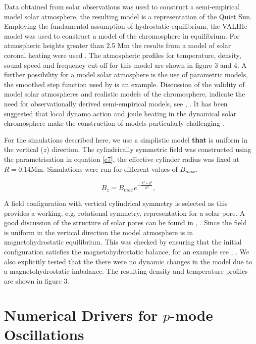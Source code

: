 \documentclass[physics,article,submit,pdftex,moreauthors]{Definitions/mdpi}
\begin{document}
Data obtained from solar observations was used to construct a semi-empirical model solar atmosphere, the resulting model is a representation of the Quiet Sun. Employing the fundamental assumption of hydrostatic equilibrium, the VALIIIc model \citet{Vernazza1981} was used to construct a model of the chromosphere in equilibrium. For atmospheric heights greater than 2.5 Mm the results from a model of solar coronal heating were used \citet{McWhirter1975}. The atmospheric profiles for temperature, density, sound speed and frequency cut-off for this model are shown in figure 3 and 4.
A further possibility for a model solar atmosphere is the use of parametric models, the smoothed step function used by \citet{Murawski2010} is an example. Discussion of the validity of model solar atmospheres and realistic models of the chromosphere,  indicate the need for observationally derived semi-empirical models, see \citet{Carlsson1995}, \citet{Kalkofen2012}. It has been suggested that local dynamo action and joule heating in the dynamical solar chromosphere make the construction of models particularly challenging \citet{Leenaarts2011}.


For the simulations described here, we use a simplistic model {\bf that} is uniform in the vertical ($z$) direction. The cylindrically symmetric field was constructed using  the parametrisation in equation \ref{e7}, the effective cylinder radius was fixed at $R=0.14$Mm. Simulations were run for different values of $B_{max}$.

\begin{equation}
B_{z}=B_{max} e^{-\frac{x^2+y^2}{R^2}} , \label{e7}
\end{equation}

A field configuration with vertical cylindrical symmetry is selected as this provides a working, e.g. rotational symmetry, representation for  a solar pore.    A good discussion of the structure of  solar pores can be found in \citet{Simon1970}, \citet{Cameron2007}.
Since the field is uniform in the vertical direction the model atmosphere is in magnetohydrostatic equilibrium. This was checked by ensuring that the initial configuration satisfies the magnetohydrostatic balance, for an example see \citet{Schussler2005}, \citet{Gent2013}. We also explicitly tested that the there were no dynamic changes in the model due to a magnetohydrostatic imbalance. The resulting density and temperature profiles are shown in figure 3. 


\section{Numerical Drivers for $p$-mode Oscillations}
\end{document}
